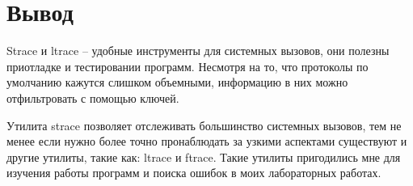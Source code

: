 \documentclass[pdf, unicode, 12pt, a4paper,oneside,fleqn]{article}
\begin{document}
\begin{alltt}
\end{alltt}

\pagebreak

\section{Вывод}

Strace и ltrace \--- удобные инструменты для системных вызовов, они полезны приотладке и тестировании программ.
Несмотря на то, что протоколы по умолчанию кажутся слишком объемными, информацию в 
них можно отфильтровать с помощью ключей.

Утилита strace позволяет отслеживать большинство системных вызовов, тем не менее если нужно
более точно пронаблюдать за узкими аспектами существуют и другие утилиты, такие как:
ltrace и ftrace. Такие утилиты пригодились мне для изучения работы программ и поиска ошибок в моих лабораторных работах.
\end{document}

